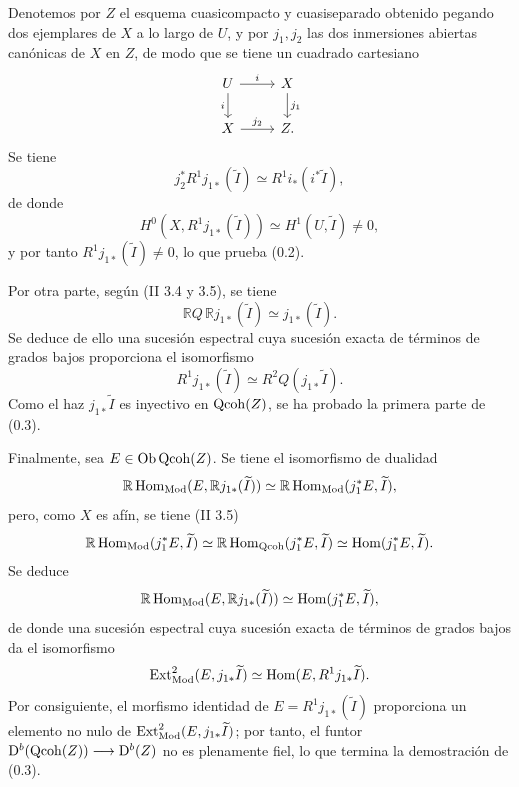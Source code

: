 \providecommand{\sisi}[2]{#2}

Denotemos por $Z$ el esquema cuasicompacto y cuasiseparado obtenido pegando dos ejemplares de $X$ a lo largo de $U$, y por $j_1,j_2$ las dos inmersiones abiertas canónicas de $X$ en $Z$, de modo que se tiene un cuadrado cartesiano
\[
\begin{tikzcd}
 U \arrow[r,"i"] \arrow[d,"i"'] & X \arrow[d,"j_1"]\\
 X \arrow[r,"j_2"] & Z .
\end{tikzcd}
\]
Se tiene
\[
 j_2^*R^1j_{1*}(\widetilde I)\simeq R^1i_*(i^*\widetilde I),
\]
de donde
\[
 H^0(X,R^1j_{1*}(\widetilde I))\simeq H^1(U,\widetilde I)\ne0,
\]
y por tanto $R^1j_{1*}(\widetilde I)\ne0$, lo que prueba (0.2).

Por otra parte, según (II 3.4 y 3.5), se tiene
\[
 \mathbb RQ\,\mathbb Rj_{1*}(\widetilde I)\simeq j_{1*}(\widetilde I).
\]
Se deduce de ello una sucesión espectral cuya sucesión exacta de términos de grados bajos proporciona el isomorfismo
\[
 R^1j_{1*}(\widetilde I)\simeq R^2Q(j_{1*}\widetilde I).
\]
Como el haz $j_{1*}\widetilde I$ es inyectivo en $\operatorname{Qcoh}(Z)$, se ha probado la primera parte de (0.3).

Finalmente, sea $E\in\operatorname{Ob}\operatorname{Qcoh}(Z)$. Se tiene el isomorfismo de dualidad
\[
 \mathbb R\operatorname{Hom}_{\operatorname{Mod}}(E,\mathbb Rj_{1*}(\widetilde I))
 \simeq \mathbb R\operatorname{Hom}_{\operatorname{Mod}}(j_1^*E,\widetilde I),
\]
pero, como $X$ es afín, se tiene (II 3.5)
\[
 \mathbb R\Hom_{\Mod}(j_1^*E,\widetilde I)
 \simeq \mathbb R\Hom_{\Qcoh}(j_1^*E,\sisi{I}{\widetilde I})
 \simeq \Hom(j_1^*E,\widetilde I).
\]
Se deduce
\[
 \mathbb R\operatorname{Hom}_{\operatorname{Mod}}(E,\mathbb Rj_{1*}(\widetilde I))
 \simeq \operatorname{Hom}(j_1^*E,\widetilde I),
\]
de donde una sucesión espectral cuya sucesión exacta de términos de grados bajos da el isomorfismo
\[
 \operatorname{Ext}^2_{\operatorname{Mod}}(E,j_{1*}\widetilde I)
 \simeq \operatorname{Hom}(E,R^1j_{1*}\widetilde I).
\]
Por consiguiente, el morfismo identidad de $E=R^1j_{1*}(\widetilde I)$ proporciona un elemento no nulo de $\operatorname{Ext}^2_{\operatorname{Mod}}(E,j_{1*}\widetilde I)$; por tanto, el funtor $\mathrm D^b(\operatorname{Qcoh}(Z))\longrightarrow \mathrm D^b(Z)$ no es plenamente fiel, lo que termina la demostración de (0.3).
